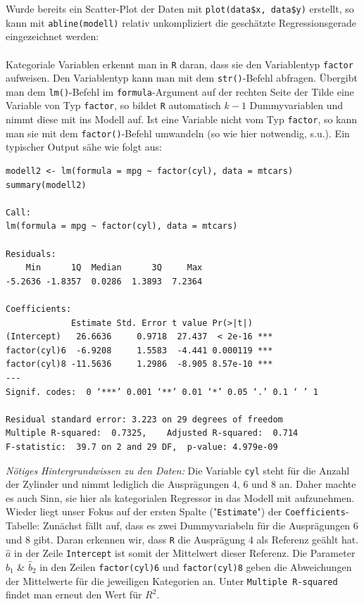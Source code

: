 \documentclass[a4paper]{article}
\newcommand\dangersign[1][2ex]{%
  \renewcommand\stacktype{L}%
  \scaleto{\stackon[1.3pt]{\color{red}$\triangle$}{\tiny !}}{#1}%
}
\begin{document}
\noindent \dangersign[3ex] Wurde bereits ein Scatter-Plot der Daten mit \texttt{plot(data\$x, data\$y)} erstellt, so kann mit \texttt{abline(modell)} relativ unkompliziert die geschätzte Regressionsgerade eingezeichnet werden:\\

\noindent {}\\

\noindent \dangersign[3ex] Kategoriale Variablen erkennt man in \texttt{R} daran, dass sie den Variablentyp \texttt{factor} aufweisen. Den Variablentyp kann man mit dem \texttt{str()}-Befehl abfragen. Übergibt man dem \texttt{lm()}-Befehl im \texttt{formula}-Argument auf der rechten Seite der Tilde eine Variable von Typ \texttt{factor}, so bildet \texttt{R} automatisch $k-1$ Dummyvariablen und nimmt diese mit ins Modell auf. Ist eine Variable nicht vom Typ \texttt{factor}, so kann man sie mit dem \texttt{factor()}-Befehl umwandeln (so wie hier notwendig, s.u.). Ein typischer Output sähe wie folgt aus:\\

\begin{small}
\begin{Verbatim}[frame=single]
modell2 <- lm(formula = mpg ~ factor(cyl), data = mtcars)
summary(modell2)

Call:
lm(formula = mpg ~ factor(cyl), data = mtcars)

Residuals:
    Min      1Q  Median      3Q     Max 
-5.2636 -1.8357  0.0286  1.3893  7.2364 

Coefficients:
             Estimate Std. Error t value Pr(>|t|)    
(Intercept)   26.6636     0.9718  27.437  < 2e-16 ***
factor(cyl)6  -6.9208     1.5583  -4.441 0.000119 ***
factor(cyl)8 -11.5636     1.2986  -8.905 8.57e-10 ***
---
Signif. codes:  0 ‘***’ 0.001 ‘**’ 0.01 ‘*’ 0.05 ‘.’ 0.1 ‘ ’ 1

Residual standard error: 3.223 on 29 degrees of freedom
Multiple R-squared:  0.7325,	Adjusted R-squared:  0.714 
F-statistic:  39.7 on 2 and 29 DF,  p-value: 4.979e-09
\end{Verbatim}
\end{small}
\textit{Nötiges Hintergrundwissen zu den Daten:} Die Variable \texttt{cyl} steht für die Anzahl der Zylinder und nimmt lediglich die Ausprägungen 4, 6 und 8 an. Daher machte es auch Sinn, sie hier als kategorialen Regressor in das Modell mit aufzunehmen.\\
Wieder liegt unser Fokus auf der ersten Spalte ("\texttt{Estimate}") der \texttt{Coefficients}-Tabelle: Zunächst fällt auf, dass es zwei Dummyvariabeln für die Ausprägungen 6 und 8 gibt. Daran erkennen wir, dass \texttt{R} die Ausprägung 4 als Referenz geählt hat. $\hat a$ in der Zeile \texttt{Intercept} ist somit der Mittelwert dieser Referenz. Die Parameter $\hat b_1$ \& $\hat b_2$ in den Zeilen \texttt{factor(cyl)6} und \texttt{factor(cyl)8} geben die Abweichungen der Mittelwerte für die jeweiligen Kategorien an. Unter \texttt{Multiple R-squared} findet man erneut den Wert für $R^2$.\\
\end{document}
